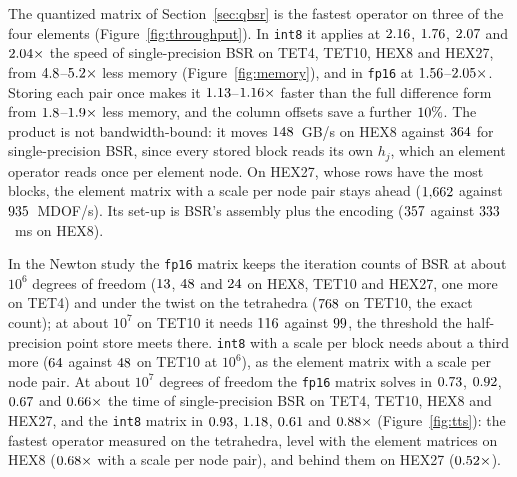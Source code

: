 \documentclass[sigconf,balance=false]{acmart}
\begin{document}
The quantized matrix of Section~\ref{sec:qbsr} is the fastest operator on three of the four
elements (Figure~\ref{fig:throughput}).  In \texttt{int8} it applies at $2.16$,
$1.76$, $2.07$ and $2.04\times$
the speed of single-precision BSR on TET4, TET10, HEX8 and HEX27, from
$4.8$--$5.2\times$ less memory
(Figure~\ref{fig:memory}), and in \texttt{fp16} at $1.56$--$2.05\times$.
Storing each pair once makes it $1.13$--$1.16\times$ faster than the
full difference form from $1.8$--$1.9\times$ less memory, and the column offsets
save a further $10\%$.  The product is not bandwidth-bound: it moves
$148$~GB/s on HEX8 against $364$ for single-precision BSR, since
every stored block reads its own $h_j$, which an element operator reads once per element node.  On
HEX27, whose rows have the most blocks, the element matrix with a scale per node pair stays ahead
($1{,}662$ against $935$~MDOF/s).  Its set-up is BSR's
assembly plus the encoding ($357$ against $333$~ms on HEX8).

In the Newton study the \texttt{fp16} matrix keeps the iteration counts of BSR at about $10^6$
degrees of freedom ($13$, $48$ and $24$
on HEX8, TET10 and HEX27, one more on TET4) and under the twist on the tetrahedra
($768$ on TET10, the exact count); at about $10^7$ on TET10 it needs
$116$ against $99$, the threshold the half-precision point
store meets there.
\texttt{int8} with a scale per block needs about a third more ($64$ against
$48$ on TET10 at $10^6$), as the element matrix with a scale per node pair.  At about
$10^7$ degrees of freedom the \texttt{fp16} matrix solves in $0.73$, $0.92$,
$0.67$ and $0.66\times$ the time of single-precision BSR on TET4,
TET10, HEX8 and HEX27, and the \texttt{int8} matrix in $0.93$, $1.18$,
$0.61$ and $0.88\times$ (Figure~\ref{fig:tts}): the fastest
operator measured on the tetrahedra, level with the element matrices on HEX8
($0.68\times$ with a scale per node pair), and behind them on HEX27
($0.52\times$).
\end{document}

